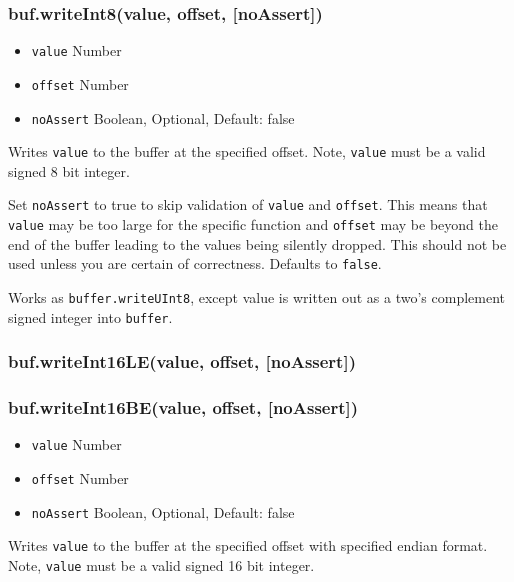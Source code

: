 \subsubsection{buf.writeInt8(value, offset,
{[}noAssert{]})}\label{buf.writeint8value-offset-noassert}

\begin{itemize}
\itemsep1pt\parskip0pt
\item
  \texttt{value} Number
\item
  \texttt{offset} Number
\item
  \texttt{noAssert} Boolean, Optional, Default: false
\end{itemize}

Writes \texttt{value} to the buffer at the specified offset. Note,
\texttt{value} must be a valid signed 8 bit integer.

Set \texttt{noAssert} to true to skip validation of \texttt{value} and
\texttt{offset}. This means that \texttt{value} may be too large for the
specific function and \texttt{offset} may be beyond the end of the
buffer leading to the values being silently dropped. This should not be
used unless you are certain of correctness. Defaults to \texttt{false}.

Works as \texttt{buffer.writeUInt8}, except value is written out as a
two's complement signed integer into \texttt{buffer}.

\subsubsection{buf.writeInt16LE(value, offset,
{[}noAssert{]})}\label{buf.writeint16levalue-offset-noassert}

\subsubsection{buf.writeInt16BE(value, offset,
{[}noAssert{]})}\label{buf.writeint16bevalue-offset-noassert}

\begin{itemize}
\itemsep1pt\parskip0pt
\item
  \texttt{value} Number
\item
  \texttt{offset} Number
\item
  \texttt{noAssert} Boolean, Optional, Default: false
\end{itemize}

Writes \texttt{value} to the buffer at the specified offset with
specified endian format. Note, \texttt{value} must be a valid signed 16
bit integer.

